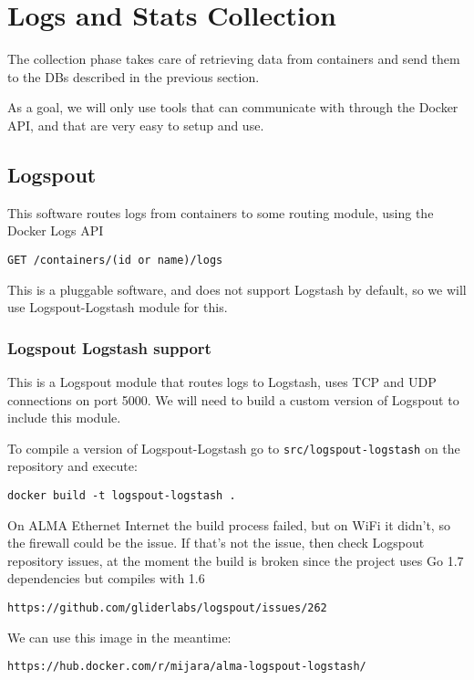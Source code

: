 \chapter{Logs and Stats Collection}

The collection phase takes care of retrieving data from containers and send them to the DBs described in the previous section.

As a goal, we will only use tools that can communicate with
through the Docker API, and that are very easy to setup and use.

\section{Logspout}

This software routes logs from containers to some routing module, using the Docker Logs API

\begin{lstlisting}
GET /containers/(id or name)/logs
\end{lstlisting}

This is a pluggable software, and does not support Logstash 
by default, so we will use Logspout-Logstash module for this.

\subsection{Logspout Logstash support}

This is a Logspout module that routes logs to Logstash, uses TCP  and UDP connections on port 5000. We will need to build a custom version of Logspout to include this module.

To compile a version of Logspout-Logstash go to 
\texttt{src/logspout-logstash} on the repository and execute:

\begin{lstlisting}
docker build -t logspout-logstash .
\end{lstlisting}

\begin{story}
On ALMA Ethernet Internet the build process failed, but on
WiFi it didn't, so the firewall could be the issue. If that's not the issue, then check Logspout repository issues, at the moment the build is broken since the project uses Go 1.7 dependencies but compiles with 1.6

\begin{lstlisting}
https://github.com/gliderlabs/logspout/issues/262
\end{lstlisting}

We can use this image in the meantime:

\begin{lstlisting}
https://hub.docker.com/r/mijara/alma-logspout-logstash/
\end{lstlisting}
\end{story}

